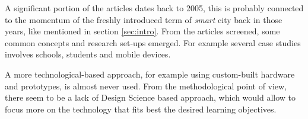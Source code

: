 A significant portion of the articles dates back to 2005, this is probably connected to the momentum of the freshly introduced term of \textit{smart} city back in those years, like mentioned in section \ref{sec:intro}.
From the articles screened, some common concepts and research set-ups emerged.
For example several case studies involves schools, students and mobile devices.

A more technological-based approach, for example using custom-built hardware and prototypes, is almost never used.
From the methodological point of view, there seem to be a lack of Design Science\cite{hevner_three_2007} based approach, which would allow to focus more on the technology that fits best the desired learning objectives.